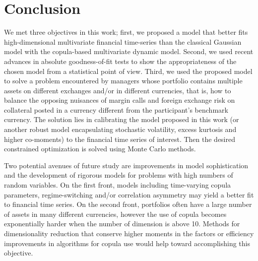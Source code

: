\section{Conclusion}
\label{conclusion}
We met three objectives in this work; first, we proposed a model that
better fits high-dimensional multivariate financial time-series than the classical
Gaussian model with the copula-based multivariate dynamic model. Second, we used
recent advances in absolute goodness-of-fit tests to show the appropriateness of the
chosen model from a statistical point of view. Third, we used the proposed model
to solve a problem encountered by managers
whose portfolio contains multiple assets on different exchanges and/or in different
currencies, that is, how to balance the opposing nuisances
of margin calls and foreign exchange risk on collateral posted in a currency
different from the participant's benchmark currency. The solution lies in calibrating
the model proposed in this work (or another robust model encapsulating stochastic
volatility, excess kurtosis and higher co-moments) to the financial time series of interest.
Then the desired constrained optimization is solved using Monte Carlo methods.

Two potential avenues of future study are improvements in model sophistication
and the development of rigorous models for problems with high numbers of random
variables. On the first front, models
including time-varying copula parameters, regime-switching and/or correlation asymmetry
may yield a better
fit to financial time series. On the second front, portfolios
often have a large number of assets in many different currencies, however the
use of copula becomes exponentially harder when the number of dimension
is above 10. Methods for dimensionality reduction that conserve higher moments
in the factors or efficiency improvements in algorithms for copula use would help
toward accomplishing this objective.
